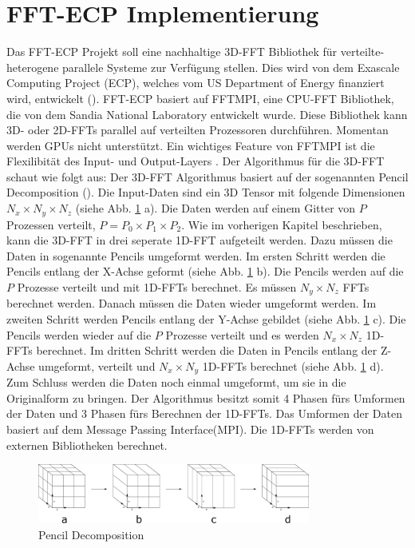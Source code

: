 \section{FFT-ECP Implementierung}
Das FFT-ECP Projekt soll eine nachhaltige 3D-FFT Bibliothek für verteilte-heterogene parallele Systeme zur Verfügung stellen. Dies wird von dem Exascale Computing Project (ECP), welches vom US Department of Energy finanziert wird, entwickelt (\cite[S. 1]{sha 19}). 
\newline
FFT-ECP basiert auf FFTMPI, eine CPU-FFT Bibliothek, die von dem Sandia National Laboratory entwickelt wurde. Diese Bibliothek kann 3D- oder 2D-FFTs parallel auf verteilten Prozessoren durchführen. Momentan werden GPUs nicht unterstützt. Ein wichtiges Feature von FFTMPI ist die Flexilibität des Input- und Output-Layers \cite[S.2]{sha 19}. 
\newline
Der Algorithmus für die 3D-FFT schaut wie folgt aus:
\newline
Der 3D-FFT Algorithmus basiert auf der sogenannten Pencil Decomposition (\cite[S.1-2]{aya 19}).
Die Input-Daten sind ein 3D Tensor mit folgende Dimensionen $N_{x} \times N_{y} \times N_{z}$ (siehe Abb. \ref{fig:pencildecomposition} a). Die Daten werden auf einem Gitter von $P$ Prozessen verteilt, $P=P_0 \times P_1 \times P_2$. Wie im vorherigen Kapitel beschrieben, kann die 3D-FFT in drei seperate 1D-FFT aufgeteilt werden. Dazu müssen die Daten in sogenannte Pencils umgeformt werden. 
\newline
Im ersten Schritt werden die Pencils entlang der X-Achse geformt (siehe Abb. \ref{fig:pencildecomposition} b). Die Pencils werden auf die $P$ Prozesse verteilt und mit 1D-FFTs berechnet. Es müssen $N_y \times N_{z}$ FFTs berechnet werden. Danach müssen die Daten wieder umgeformt werden. 
\newline
Im zweiten Schritt werden Pencils entlang der Y-Achse gebildet (siehe Abb. \ref{fig:pencildecomposition} c). Die Pencils werden wieder auf die $P$ Prozesse verteilt und es werden $N_x \times N_z$ 1D-FFTs berechnet. 
\newline
Im dritten Schritt werden die Daten in Pencils entlang der Z-Achse umgeformt, verteilt und $N_x \times N_y$ 1D-FFTs berechnet (siehe Abb. \ref{fig:pencildecomposition} d). Zum Schluss werden die Daten noch einmal umgeformt, um sie in die Originalform zu bringen. 
\newline
Der Algorithmus besitzt somit 4 Phasen fürs Umformen der Daten und 3 Phasen fürs Berechnen der 1D-FFTs. Das Umformen der Daten basiert auf dem Message Passing Interface(MPI). Die 1D-FFTs werden von externen Bibliotheken berechnet.

\begin{figure}
\centering
 \includegraphics[width=0.8\textwidth]{Pictures/PencilsDecomposition.png}
\caption{Pencil Decomposition}
\label{fig:pencildecomposition}
\end{figure} 






